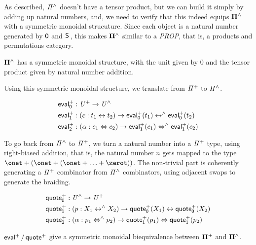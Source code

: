As described, $\mathit{{\Pi}^{\wedge}}$ doesn't have a tensor product, but we can build it simply by adding up natural numbers, and,
we need to verify that this indeed equips $\mathbf{\Pi^{\wedge}}$ with a symmetric monoidal strucuture. Since each object is a
natural number generated by $\operatorname{\mathsf{0}}$ and $\suc$, this makes $\mathbf{\Pi^{\wedge}}$ similar to a \emph{PROP}, that is, a products and
permutations category.

\begin{proposition}
  $\mathbf{\Pi^{\wedge}}$ has a symmetric monoidal structure, with the unit given by 0 and the tensor product given by natural
  number addition.
\end{proposition}

Using this symmetric monoidal structure, we translate from $\mathit{{\Pi}^{+}}$ to $\mathit{{\Pi}^{\wedge}}$.

\begin{definition}
  \begin{align*}
    \evalp_{0} & : \UPlus \to \UHat                                                          \\
    \evalp_{1} & : (c : t_{1} \iso t_{2}) \to \evalp_{0}(t_{1}) \isoh \evalp_{0}(t_{2})      \\
    \evalp_{2} & : (\alpha : c_{1} \Iso c_{2}) \to \evalp_{1}(c_{1}) \Isoh \evalp_{1}(c_{2})
  \end{align*}
\end{definition}

To go back from $\mathit{{\Pi}^{\wedge}}$ to $\mathit{{\Pi}^{+}}$, we turn a natural number into a $\mathit{{\Pi}^{+}}$ type, using right-biased
addition, that is, the natural number $n$ gets mapped to the type $\onet + (\onet + (\onet + \ldots + \zerot))$. The
non-trivial part is coherently generating a $\mathit{{\Pi}^{+}}$ combinator from $\mathit{{\Pi}^{\wedge}}$ combinators, using adjacent swaps
to generate the braiding.

\begin{definition}
  \begin{align*}
    \quotep_{0} & : \UHat \to \UPlus                                                            \\
    \quotep_{1} & : (p : X_{1} \isoh X_{2}) \to \quotep_{0}(X_{1}) \iso \quotep_{0}(X_{2})      \\
    \quotep_{2} & : (\alpha : p_{1} \Isoh p_{2}) \to \quotep_{1}(p_{1}) \Iso \quotep_{1}(p_{2})
  \end{align*}
\end{definition}

\begin{proposition}
  $\evalp/\quotep$ give a symmetric monoidal biequivalence between $\mathbf{\Pi^{+}}$ and $\mathbf{\Pi^{\wedge}}$.
\end{proposition}

